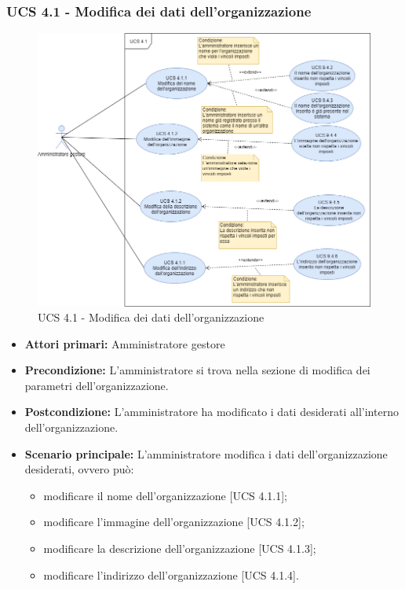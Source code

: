 \subsubsection{UCS 4.1 - Modifica dei dati dell'organizzazione}%
\begin{figure}[h]
	\centering
    \includegraphics[scale=0.53]{sezioni/UseCase/Immagini/UCS4.1.png}
    \caption{UCS 4.1 - Modifica dei dati dell'organizzazione}
\end{figure}
\begin{itemize}
    \item \textbf{Attori primari:} Amministratore gestore
    \item \textbf{Precondizione:} L'amministratore si trova nella sezione di modifica dei parametri dell'organizzazione.
    \item \textbf{Postcondizione:} L'amministratore ha modificato i dati desiderati all'interno dell’organizzazione.
    \item \textbf{Scenario principale:} L'amministratore modifica i dati dell'organizzazione desiderati, ovvero può:
    \begin{itemize}
        \item modificare il nome dell'organizzazione [UCS 4.1.1];
        \item modificare l'immagine dell'organizzazione [UCS 4.1.2];
        \item modificare la descrizione dell'organizzazione [UCS 4.1.3];
        \item modificare l'indirizzo dell'organizzazione [UCS 4.1.4].
    \end{itemize}
\end{itemize}

